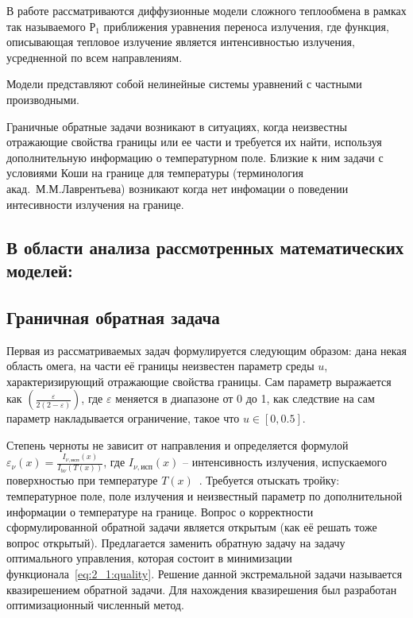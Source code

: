\documentclass[8pt,a4paper]{article}
\begin{document}
    В работе рассматриваются диффузионные модели сложного теплообмена
    в рамках так называемого $Р_1$ приближения уравнения переноса излучения,
    где функция, описывающая тепловое излучение является интенсивностью излучения,
    усредненной по всем направлениям.

    Модели представляют собой нелинейные системы уравнений с частными производными.

    Граничные обратные задачи возникают в ситуациях,
    когда неизвестны отражающие свойства границы или ее части и требуется их найти,
    используя дополнительную информацию о температурном поле.
    Близкие к ним задачи с условиями Коши на границе для температуры
    (терминология акад.\ М.М.Лаврентьева) возникают когда нет инфомации
    о поведении интесивности излучения на границе.

    \subsection*{В области анализа рассмотренных математических моделей:}

    \vspace{15cm}

    \subsection*{Граничная обратная задача}
    Первая из рассматриваемых задач формулируется следующим образом:
    дана некая область омега,
    на части её границы неизвестен параметр среды $u$, характеризирующий отражающие свойства границы.
    Сам параметр выражается как $(\frac{\varepsilon}{2(2-\varepsilon)})$, где $\varepsilon$ меняется в диапазоне от 0 до 1,
    как следствие на сам параметр накладывается ограничение, такое что $u \in [0, 0.5]$.

    Степень черноты не зависит от направления и определяется формулой
    $\varepsilon_\nu(x) = \frac{I_{\nu,\text{исп}}(x)}{I_{b\nu}(T(x))}$, где
    $I_{\nu,\text{исп}}(x)$ -- интенсивность излучения, испускаемого
    поверхностью при температуре $T(x)$~\cite[53]{Ozisik1976}.
    Требуется отыскать тройку: температурное поле,
    поле излучения и неизвестный параметр
    по дополнительной информации о температуре на границе.
    Вопрос о корректности сформулированной обратной задачи является открытым
    (как её решать тоже вопрос открытый).
    Предлагается заменить обратную задачу на задачу
    оптимального управления, которая состоит в
    минимизации функционала~\eqref{eq:2_1:quality}.
    Решение данной экстремальной задачи называется квазирешением обратной задачи.
    Для нахождения квазирешения был разработан оптимизационный численный метод.
\end{document}
